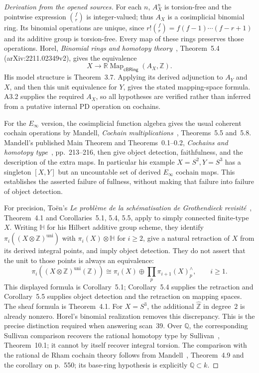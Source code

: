 \begin{proof}[Derivation from the opened sources]
For each $n$, $A_X^n$ is torsion-free and the pointwise expression
$\binom f r$ is integer-valued; thus $A_X$ is a cosimplicial binomial
ring. Its binomial operations are unique, since
$r!\binom f r=f(f-1)\cdots(f-r+1)$ and its additive group is torsion-free.
Every map of these rings preserves those operations.
Horel, \emph{Binomial rings and homotopy theory}~\cite{Horel2025}, Theorem~5.4
(arXiv:2211.02349v2), gives the equivalence
\[
 X\longrightarrow
 \mathbb R\operatorname{Map}_{\mathsf{cBRing}}(A_X,\mathbb Z).
\]
His model structure is Theorem~3.7. Applying its derived adjunction to
$A_Y$ and $X$, and then this unit equivalence for $Y$, gives the stated
mapping-space formula. A3.2 supplies the required $A_X$, so all
hypotheses are verified rather than inferred from a putative internal
PD operation on cochains.

For the $E_\infty$ version, the cosimplicial function algebra gives the
usual coherent cochain operations by Mandell, \emph{Cochain multiplications}~\cite{Mandell2002}, Theorems~5.5 and~5.8. Mandell's published Main Theorem
and Theorems~0.1--0.2, \emph{Cochains and homotopy type}~\cite{Mandell2006}, pp.~213--216,
then give object detection, faithfulness, and the description of the
extra maps. In particular his example $X=S^2,Y=S^3$ has a singleton
$[X,Y]$ but an uncountable set of derived $E_\infty$ cochain maps.
This establishes the asserted failure of fullness, without making that
failure into failure of object detection.

For precision, To\"en's \emph{Le probl\`eme de la sch\'ematisation de
Grothendieck revisit\'e}~\cite{Toen2020}, Theorem~4.1 and Corollaries~5.1, 5.4, 5.5,
apply to simply connected finite-type $X$. Writing $\mathbb H$ for his
Hilbert additive group scheme, they identify
$\pi_i((X\otimes\mathbb Z)^{\mathrm{uni}})$ with
$\pi_i(X)\otimes\mathbb H$ for $i\geq2$, give a natural retraction of $X$ from
its derived integral points, and imply object detection. They do not
assert that the unit to those points is always an equivalence:
\[
 \pi_i((X\otimes\mathbb Z)^{\mathrm{uni}}(\mathbb Z))
 \cong \pi_i(X)\oplus\prod_p\pi_{i+1}(X)^{\wedge}_p,
 \qquad i\geq1.
\]
This displayed formula is Corollary~5.1; Corollary~5.4 supplies the
retraction and Corollary~5.5 supplies object detection and the
retraction on mapping spaces. The sheaf formula is Theorem~4.1.
For $X=S^3$, the additional $\widehat{\mathbb Z}$ in degree~$2$ is
already nonzero. Horel's binomial realization removes this discrepancy.
This is the precise distinction required when answering scan~39.
Over $\mathbb Q$, the corresponding Sullivan comparison recovers the
rational homotopy type by Sullivan~\cite{Sullivan1977}, Theorem~10.1; it cannot by itself recover integral torsion. The comparison with the rational de Rham cochain theory follows from Mandell~\cite{Mandell2002}, Theorem~4.9 and the corollary on p.~550; its base-ring hypothesis is explicitly $\mathbb Q\subset k$.


\end{proof}
